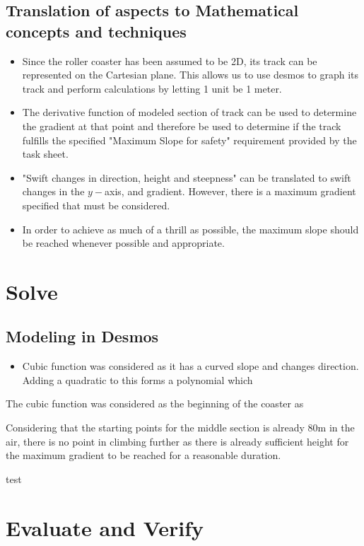 \documentclass[11pt, letterpaper]{article}
\begin{document}
\subsection{Translation of aspects to Mathematical concepts and techniques}
\begin{itemize}
	\item Since the roller coaster has been assumed to be 2D, its track can be represented on the Cartesian plane. This allows us to use desmos to graph its track and perform calculations by letting 1 unit be 1 meter. 
	\item The derivative function of modeled section of track can be used to determine the gradient at that point and therefore be used to determine if the track fulfills the specified "Maximum Slope for safety" requirement provided by the task sheet.
	\item "Swift changes in direction, height and steepness" can be translated to swift changes in the $y-$axis, and gradient. However, there is a maximum gradient specified that must be considered. 
	\item In order to achieve as much of a thrill as possible, the maximum slope should be reached whenever possible and appropriate.

\end{itemize}


\section{Solve}
\subsection{Modeling in Desmos}
\begin{itemize}
	\item Cubic function was considered as it has a curved slope and changes direction. Adding a quadratic to this forms a polynomial which 
\end{itemize}
\item The cubic function was considered as the beginning of the coaster as 
\item Considering that the starting points for the middle section is already 80m in the air, there is no point in climbing further as there is already sufficient height for the maximum gradient to be reached for a reasonable duration. 
\item test




\section{Evaluate and Verify}
\end{document}
